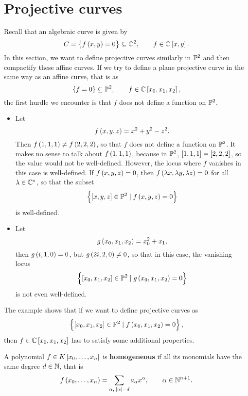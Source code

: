 \pagebreak

\section{Projective curves}


Recall that an algebraic curve is given by
$$ C = \cbr{f\br{x, y} = 0} \subseteq \C^2, \qquad f \in \C\sbr{x, y}. $$
In this section, we want to define projective curves similarly in $ \P^2 $ and then compactify these affine curves. If we try to define a plane projective curve in the same way as an affine curve, that is as
$$ \cbr{f = 0} \subseteq \P^2, \qquad f \in \C\sbr{x_0, x_1, x_2}, $$
the first hurdle we encounter is that $ f $ does not define a function on $ \P^2 $.

\begin{example}
\hfill
\begin{itemize}
\item Let
$$ f\br{x, y, z} = x^2 + y^2 - z^2. $$
Then $ f\br{1, 1, 1} \ne f\br{2, 2, 2} $, so that $ f $ does not define a function on $ \P^2 $. It makes no sense to talk about $ f\br{1, 1, 1} $, because in $ \P^2 $, $ \sbr{1, 1, 1} = \sbr{2, 2, 2} $, so the value would not be well-defined. However, the locus where $ f $ vanishes in this case is well-defined. If $ f\br{x, y, z} = 0 $, then $ f\br{\lambda x, \lambda y, \lambda z} = 0 $ for all $ \lambda \in \C^* $, so that the subset
$$ \cbr{\sbr{x, y, z} \in \P^2 \mid f\br{x, y, z} = 0} $$
is well-defined.
\item Let
$$ g\br{x_0, x_1, x_2} = x_0^2 + x_1, $$
then $ g\br{i, 1, 0} = 0 $, but $ g\br{2i, 2, 0} \ne 0 $, so that in this case, the vanishing locus
$$ \cbr{\sbr{x_0, x_1, x_2} \in \P^2 \mid g\br{x_0, x_1, x_2} = 0} $$
is not even well-defined.
\end{itemize}
\end{example}

The example shows that if we want to define projective curves as
$$ \cbr{\sbr{x_0, x_1, x_2} \in \P^2 \mid f\br{x_0, x_1, x_2} = 0}, $$
then $ f \in \C\sbr{x_0, x_1, x_2} $ has to satisfy some additional properties.

\begin{definition}
A polynomial $ f \in K\sbr{x_0, \dots, x_n} $ is \textbf{homogeneous} if all its monomials have the same degree $ d \in \N $, that is
$$ f\br{x_0, \dots, x_n} = \sum_{\alpha, \ \abs{\alpha} = d} a_\alpha x^\alpha, \qquad \alpha \in \N^{n + 1}. $$
\end{definition}

